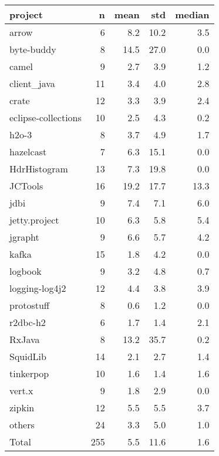 \begin{tabular}{lrrrr}
\toprule
            project &   n &  mean &  std &  median \\
\midrule
              arrow &   6 &   8.2 & 10.2 &     3.5 \\
         byte-buddy &   8 &  14.5 & 27.0 &     0.0 \\
              camel &   9 &   2.7 &  3.9 &     1.2 \\
        client\_java &  11 &   3.4 &  4.0 &     2.8 \\
              crate &  12 &   3.3 &  3.9 &     2.4 \\
eclipse-collections &  10 &   2.5 &  4.3 &     0.2 \\
              h2o-3 &   8 &   3.7 &  4.9 &     1.7 \\
          hazelcast &   7 &   6.3 & 15.1 &     0.0 \\
       HdrHistogram &  13 &   7.3 & 19.8 &     0.0 \\
            JCTools &  16 &  19.2 & 17.7 &    13.3 \\
               jdbi &   9 &   7.4 &  7.1 &     6.0 \\
      jetty.project &  10 &   6.3 &  5.8 &     5.4 \\
            jgrapht &   9 &   6.6 &  5.7 &     4.2 \\
              kafka &  15 &   1.8 &  4.2 &     0.0 \\
            logbook &   9 &   3.2 &  4.8 &     0.7 \\
     logging-log4j2 &  12 &   4.4 &  3.8 &     3.9 \\
         protostuff &   8 &   0.6 &  1.2 &     0.0 \\
           r2dbc-h2 &   6 &   1.7 &  1.4 &     2.1 \\
             RxJava &   8 &  13.2 & 35.7 &     0.2 \\
           SquidLib &  14 &   2.1 &  2.7 &     1.4 \\
          tinkerpop &  10 &   1.6 &  1.4 &     1.6 \\
             vert.x &   9 &   1.8 &  2.9 &     0.0 \\
             zipkin &  12 &   5.5 &  5.5 &     3.7 \\
             others &  24 &   3.3 &  5.0 &     1.0 \\
              Total & 255 &   5.5 & 11.6 &     1.6 \\
\bottomrule
\end{tabular}
